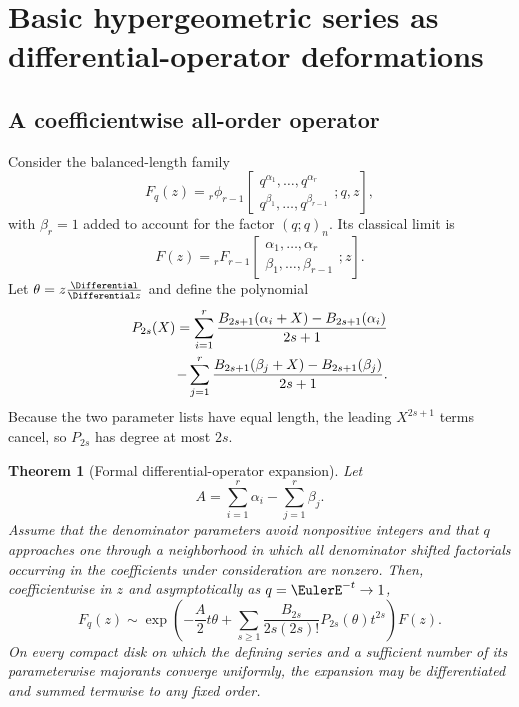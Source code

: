 \documentclass[11pt,oneside]{article}
\newtheorem{theorem}{Theorem}[section]
\theoremstyle{definition}
\theoremstyle{remark}
\let\reporttopsection\section
\let\reportsubsection\subsection
\let\chapter\reporttopsection
\let\section\reportsubsection
\begin{document}
\chapter{Basic hypergeometric series as differential-operator deformations}
\label{chap:hypergeom-deform}

\section{A coefficientwise all-order operator}

Consider the balanced-length family
\begin{equation}\label{eq:rphi}
 F_q(z)={}_r\phi_{r-1}
 \left[\begin{matrix}q^{\alpha_1},\ldots,q^{\alpha_r}\\
 q^{\beta_1},\ldots,q^{\beta_{r-1}}
 \end{matrix};q,z\right],
\end{equation}
with $\beta_r=1$ added to account for the factor $(q;q)_n$.  Its classical
limit is
\[
 F(z)={}_rF_{r-1}
 \left[\begin{matrix}\alpha_1,\ldots,\alpha_r\\
 \beta_1,\ldots,\beta_{r-1}
 \end{matrix};z\right].
\]
Let $\theta=z\frac{\Differential}{\Differential z}$ and define the polynomial
\begin{align}
 P_{2s}(X)=\sum_{i=1}^{r}
 \frac{B_{2s+1}(\alpha_i+X)-B_{2s+1}(\alpha_i)}{2s+1}
 \notag\\
 -\sum_{j=1}^{r}
 \frac{B_{2s+1}(\beta_j+X)-B_{2s+1}(\beta_j)}{2s+1}.
 \label{eq:P-hypergeom}
\end{align}
Because the two parameter lists have equal length, the leading $X^{2s+1}$
terms cancel, so $P_{2s}$ has degree at most $2s$.

\begin{theorem}[Formal differential-operator expansion]
\label{thm:hypergeom-operator}
Let
\[
 A=\sum_{i=1}^{r}\alpha_i-\sum_{j=1}^{r}\beta_j.
\]
Assume that the denominator parameters avoid nonpositive integers and that
$q$ approaches one through a neighborhood in which all denominator shifted
factorials occurring in the coefficients under consideration are nonzero.
Then, coefficientwise in $z$ and asymptotically as $q=\EulerE^{-t}\to1$,
\begin{equation}\label{eq:hypergeom-operator}
 F_q(z)\sim
 \exp\left(
 -\frac{A}{2}t\theta+
 \sum_{s\ge1}\frac{B_{2s}}{2s(2s)!}
 P_{2s}(\theta)t^{2s}
 \right)F(z).
\end{equation}
On every compact disk on which the defining series and a sufficient number of
its parameterwise majorants converge uniformly, the expansion may be
differentiated and summed termwise to any fixed order.
\end{theorem}
\end{document}
